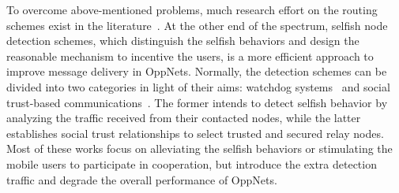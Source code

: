 To overcome above-mentioned problems,
much research effort on the routing schemes
exist in the literature~\cite{DBLP:journals/tpds/ZhuDGDC14,
DBLP:conf/mobicom/MartiGLB00,
DBLP:journals/tmc/LoretiB20}.
At the other end of the spectrum,
selfish node detection schemes,
which distinguish the selfish behaviors
and design the reasonable mechanism to
incentive the users,
is a more efficient approach to improve
message delivery in OppNets.
%
Normally,
the detection schemes
can be divided into two categories
in light of their aims:
watchdog systems~\cite{DBLP:journals/tmc/Hernandez-Orallo15,
DBLP:journals/tie/DiasRXM15,
DBLP:journals/fgcs/JedariXCDTA19}
and social trust-based communications~\cite{DBLP:journals/tdsc/ChoC18,
DBLP:conf/sigcomm/SouzaMSMCC16,
DBLP:journals/tmc/ChoiSLW12}.
The former intends to detect selfish behavior
by analyzing the traffic received
from their contacted nodes,
while the latter establishes social trust relationships
to select trusted and secured relay nodes.
Most of these works
focus on alleviating the selfish behaviors
or stimulating the mobile users to participate in cooperation,
but introduce the extra detection traffic
and degrade the overall performance of OppNets.

